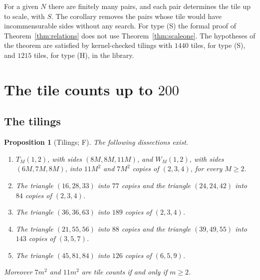 \documentclass[11pt,reqno]{amsart}
\theoremstyle{plain}
\newtheorem{proposition}[theorem]{Proposition}
\theoremstyle{definition}
\newcommand{\sF}{\textup{\textsf{F}}}
\begin{document}
For a given $N$ there are finitely many pairs, and each pair determines the tile up to scale, with $S$. The
corollary removes the pairs whose tile would have incommensurable sides without any search. For type (S)
the formal proof of Theorem~\ref{thm:relations} does not use Theorem~\ref{thm:scaleone}. The hypotheses of
the theorem are satisfied by kernel-checked tilings with $1440$ tiles, for type (S), and $1215$ tiles, for
type (H), in the library.

\section{The tile counts up to $200$}\label{sec:200}

\subsection{The tilings}

\begin{proposition}[Tilings; \sF]\label{prop:tilings}
The following dissections exist.
\begin{enumerate}
\item[\textup{(i)}] $T_M(1,2)$, with sides $(8M,8M,11M)$, and $W_M(1,2)$, with sides $(6M,7M,8M)$, into
$11M^2$ and $7M^2$ copies of $(2,3,4)$, for every $M\ge2$.
\item[\textup{(ii)}] The triangle $(16,28,33)$ into $77$ copies and the triangle $(24,24,42)$ into $84$
copies of $(2,3,4)$.
\item[\textup{(iii)}] The triangle $(36,36,63)$ into $189$ copies of $(2,3,4)$.
\item[\textup{(iv)}] The triangle $(21,55,56)$ into $88$ copies and the triangle $(39,49,55)$ into $143$
copies of $(3,5,7)$.
\item[\textup{(v)}] The triangle $(45,81,84)$ into $126$ copies of $(6,5,9)$.
\end{enumerate}
Moreover $7m^2$ and $11m^2$ are tile counts if and only if $m\ge2$.
\end{proposition}
\end{document}
